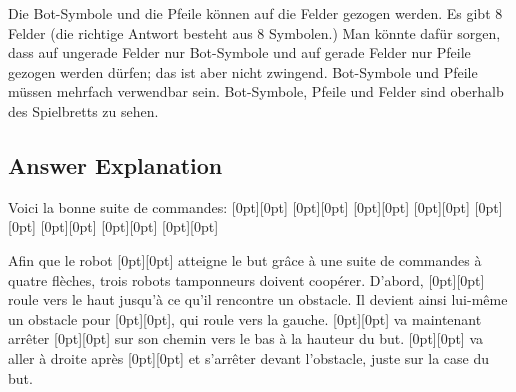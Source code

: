 \documentclass[a4paper,11pt]{report}
\newcommand{\taskGraphicsFolder}{..}
\begin{document}
Die Bot-Symbole und die Pfeile können auf die Felder gezogen werden.  Es gibt $8$ Felder (die richtige Antwort besteht aus $8$ Symbolen.)  Man könnte dafür sorgen, dass auf ungerade Felder nur Bot-Symbole und auf gerade Felder nur Pfeile gezogen werden dürfen; das ist aber nicht zwingend.  Bot-Symbole und Pfeile müssen mehrfach verwendbar sein.  Bot-Symbole, Pfeile und Felder sind oberhalb des Spielbretts zu sehen.

\endgroup

\subsection*{Answer Explanation}

Voici la bonne suite de commandes:
\raisebox{-0.5ex}[0pt][0pt]{} \raisebox{-0.5ex}[0pt][0pt]{}  \raisebox{-0.5ex}[0pt][0pt]{} \raisebox{-0.5ex}[0pt][0pt]{}  \raisebox{-0.5ex}[0pt][0pt]{} \raisebox{-0.5ex}[0pt][0pt]{}  \raisebox{-0.5ex}[0pt][0pt]{} \raisebox{-0.5ex}[0pt][0pt]{}

Afin que le robot \raisebox{-0.5ex}[0pt][0pt]{} atteigne le but grâce à une suite de commandes à quatre flèches, trois robots tamponneurs doivent coopérer. D’abord, \raisebox{-0.5ex}[0pt][0pt]{} roule vers le haut jusqu’à ce qu’il rencontre un obstacle. Il devient ainsi lui-même un obstacle pour \raisebox{-0.5ex}[0pt][0pt]{}, qui roule vers la gauche. \raisebox{-0.5ex}[0pt][0pt]{} va maintenant arrêter \raisebox{-0.5ex}[0pt][0pt]{} sur son chemin vers le bas à la hauteur du but. \raisebox{-0.5ex}[0pt][0pt]{} va aller à droite après \raisebox{-0.5ex}[0pt][0pt]{} et s’arrêter devant l’obstacle, juste sur la case du but.
\end{document}
